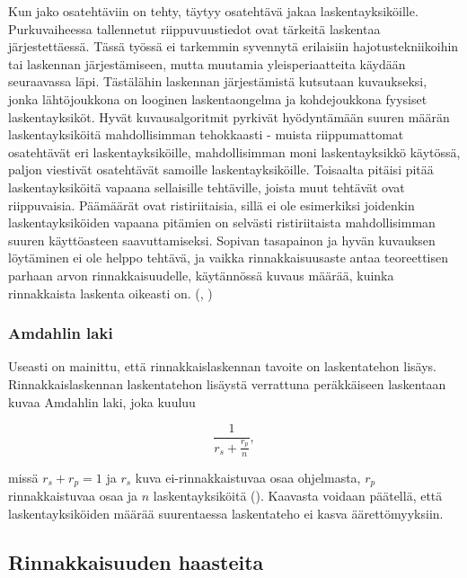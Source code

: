 Kun jako osatehtäviin on tehty, täytyy osatehtävä jakaa laskentayksiköille.
Purkuvaiheessa tallennetut riippuvuustiedot ovat tärkeitä laskentaa
järjestettäessä. Tässä työssä ei tarkemmin syvennytä erilaisiin
hajotustekniikoihin tai laskennan järjestämiseen, mutta muutamia
yleisperiaatteita käydään seuraavassa läpi. Tästälähin laskennan järjestämistä
kutsutaan kuvaukseksi, jonka lähtöjoukkona on looginen laskentaongelma ja kohdejoukkona fyysiset laskentayksiköt.
Hyvät kuvausalgoritmit pyrkivät hyödyntämään suuren määrän laskentayksiköitä
mahdollisimman tehokkaasti - muista riippumattomat osatehtävät eri
laskentayksiköille, mahdollisimman moni laskentayksikkö käytössä,
paljon viestivät osatehtävät samoille laskentayksiköille.
Toisaalta pitäisi pitää laskentayksiköitä vapaana sellaisille tehtäville,
joista muut tehtävät ovat riippuvaisia. Päämäärät ovat ristiriitaisia, sillä
ei ole esimerkiksi joidenkin laskentayksiköiden vapaana pitämien on selvästi
ristiriitaista mahdollisimman suuren käyttöasteen saavuttamiseksi. Sopivan
tasapainon ja hyvän kuvauksen löytäminen ei ole helppo tehtävä, ja vaikka
rinnakkaisuusaste antaa teoreettisen parhaan arvon rinnakkaisuudelle,
käytännössä kuvaus määrää, kuinka rinnakkaista laskenta oikeasti on.
(\citealt{intro}, \citealt{rauber})

\subsubsection{Amdahlin laki}

Useasti on mainittu, että rinnakkaislaskennan tavoite on laskentatehon
lisäys. Rinnakkaislaskennan laskentatehon lisäystä verrattuna peräkkäiseen
laskentaan kuvaa Amdahlin laki, joka kuuluu

\begin{center}
\begin{equation}\frac{1}{r_s + \frac{r_p}{n}},\end{equation}
\end{center}

missä $r_s + r_p = 1$ ja $r_s$ kuva ei-rinnakkaistuvaa osaa ohjelmasta,
$r_p$ rinnakkaistuvaa osaa ja $n$ laskentayksiköitä (\citealt{amdahl}).
Kaavasta voidaan päätellä, että laskentayksiköiden määrää suurentaessa
laskentateho ei kasva äärettömyyksiin.

\subsection{Rinnakkaisuuden haasteita}

